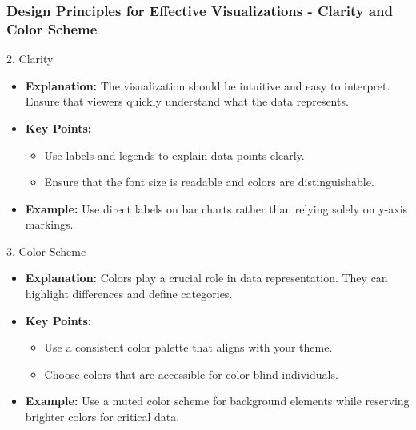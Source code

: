 \documentclass[aspectratio=169]{beamer}
\begin{document}
\begin{frame}[fragile]
    \frametitle{Design Principles for Effective Visualizations - Clarity and Color Scheme}
    \begin{block}{2. Clarity}
        \begin{itemize}
            \item \textbf{Explanation:} The visualization should be intuitive and easy to interpret. Ensure that viewers quickly understand what the data represents.
            \item \textbf{Key Points:}
                \begin{itemize}
                    \item Use labels and legends to explain data points clearly.
                    \item Ensure that the font size is readable and colors are distinguishable.
                \end{itemize}
            \item \textbf{Example:} Use direct labels on bar charts rather than relying solely on y-axis markings.
        \end{itemize}
    \end{block}

    \begin{block}{3. Color Scheme}
        \begin{itemize}
            \item \textbf{Explanation:} Colors play a crucial role in data representation. They can highlight differences and define categories.
            \item \textbf{Key Points:}
                \begin{itemize}
                    \item Use a consistent color palette that aligns with your theme.
                    \item Choose colors that are accessible for color-blind individuals.
                \end{itemize}
            \item \textbf{Example:} Use a muted color scheme for background elements while reserving brighter colors for critical data.
        \end{itemize}
    \end{block}
\end{frame}
\end{document}

